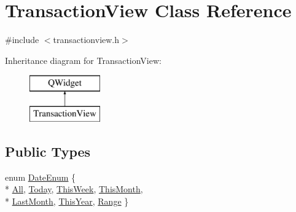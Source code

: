 \hypertarget{class_transaction_view}{}\section{Transaction\+View Class Reference}
\label{class_transaction_view}


{\ttfamily \#include $<$transactionview.\+h$>$}

Inheritance diagram for Transaction\+View\+:\begin{figure}[H]
\begin{center}
\leavevmode
\includegraphics[height=2.000000cm]{class_transaction_view}
\end{center}
\end{figure}
\subsection*{Public Types}
\begin{DoxyCompactItemize}
\item 
enum \hyperlink{class_transaction_view_a73d1bbedc72fa131591aadb3aba150f8}{Date\+Enum} \{ \\*
\hyperlink{class_transaction_view_a73d1bbedc72fa131591aadb3aba150f8a4c8bf710ad7b3be71d6da978c62e49fe}{All}, 
\hyperlink{class_transaction_view_a73d1bbedc72fa131591aadb3aba150f8af944f2a9373333fc348d517aad15fd93}{Today}, 
\hyperlink{class_transaction_view_a73d1bbedc72fa131591aadb3aba150f8ad690fc9e22dbb55e86f2198553d26bec}{This\+Week}, 
\hyperlink{class_transaction_view_a73d1bbedc72fa131591aadb3aba150f8a34f3d05ba9262c629e7d6a4e809ab927}{This\+Month}, 
\\*
\hyperlink{class_transaction_view_a73d1bbedc72fa131591aadb3aba150f8ab119e2fd1a4a132c780c82cfe982f218}{Last\+Month}, 
\hyperlink{class_transaction_view_a73d1bbedc72fa131591aadb3aba150f8a783e0105c0ec8447b33a84ce44951eb5}{This\+Year}, 
\hyperlink{class_transaction_view_a73d1bbedc72fa131591aadb3aba150f8a5282c94849c51ee19eaa9cf929428b10}{Range}
 \}
\end{DoxyCompactItemize}
